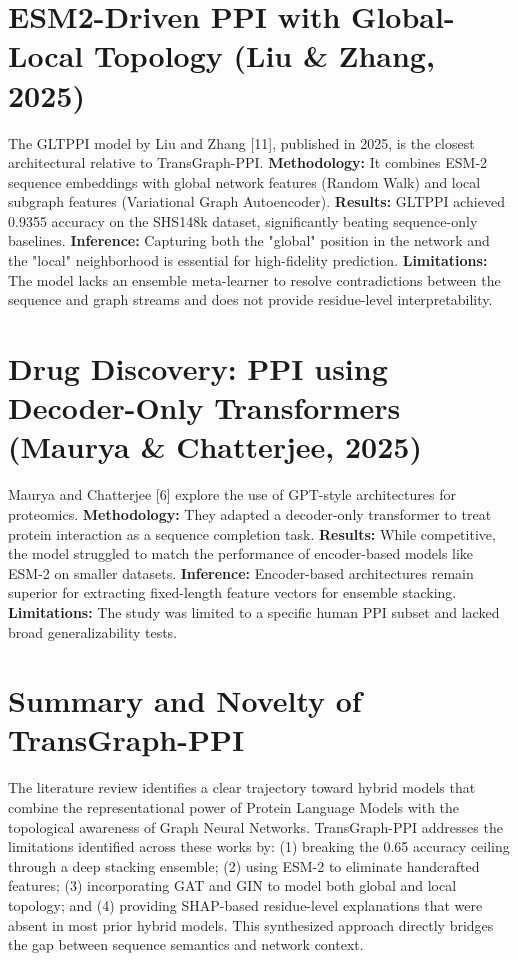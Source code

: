 \documentclass[12pt,a4paper]{report}
\begin{document}
\section{ESM2-Driven PPI with Global-Local Topology (Liu \& Zhang, 2025)}
The GLTPPI model by Liu and Zhang [11], published in 2025, is the closest architectural relative to TransGraph-PPI.
\textbf{Methodology:} It combines ESM-2 sequence embeddings with global network features (Random Walk) and local subgraph features (Variational Graph Autoencoder).
\textbf{Results:} GLTPPI achieved 0.9355 accuracy on the SHS148k dataset, significantly beating sequence-only baselines.
\textbf{Inference:} Capturing both the "global" position in the network and the "local" neighborhood is essential for high-fidelity prediction.
\textbf{Limitations:} The model lacks an ensemble meta-learner to resolve contradictions between the sequence and graph streams and does not provide residue-level interpretability.

\section{Drug Discovery: PPI using Decoder-Only Transformers (Maurya \& Chatterjee, 2025)}
Maurya and Chatterjee [6] explore the use of GPT-style architectures for proteomics.
\textbf{Methodology:} They adapted a decoder-only transformer to treat protein interaction as a sequence completion task.
\textbf{Results:} While competitive, the model struggled to match the performance of encoder-based models like ESM-2 on smaller datasets.
\textbf{Inference:} Encoder-based architectures remain superior for extracting fixed-length feature vectors for ensemble stacking.
\textbf{Limitations:} The study was limited to a specific human PPI subset and lacked broad generalizability tests.

\section{Summary and Novelty of TransGraph-PPI}
The literature review identifies a clear trajectory toward hybrid models that combine the representational power of Protein Language Models with the topological awareness of Graph Neural Networks. TransGraph-PPI addresses the limitations identified across these works by: (1) breaking the 0.65 accuracy ceiling through a deep stacking ensemble; (2) using ESM-2 to eliminate handcrafted features; (3) incorporating GAT and GIN to model both global and local topology; and (4) providing SHAP-based residue-level explanations that were absent in most prior hybrid models. This synthesized approach directly bridges the gap between sequence semantics and network context.
\end{document}
